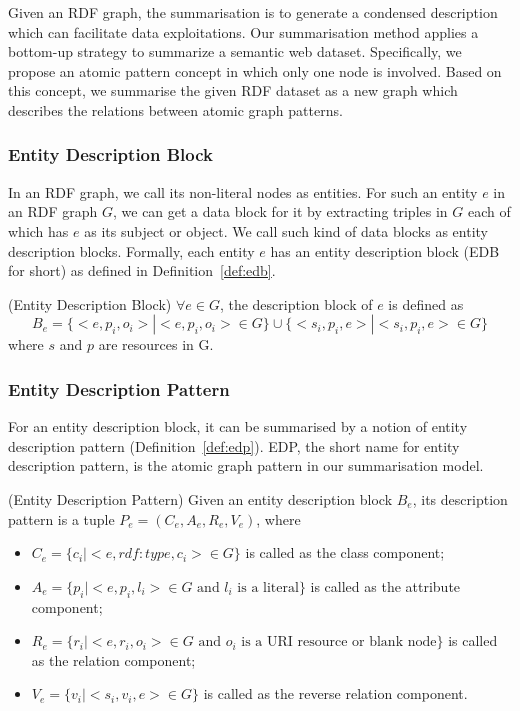 \vspace{-2mm}
Given an RDF graph, the summarisation is to generate a condensed description which can facilitate data exploitations. Our summarisation method applies a bottom-up strategy to summarize a semantic web dataset. Specifically, we propose an atomic pattern concept in which only one node is involved. Based on this concept, we summarise the given RDF dataset as a new graph which describes the relations between atomic graph patterns.

\vspace{-4ex}
\subsubsection{Entity Description Block}
In an RDF graph, we call its non-literal nodes as entities. For such an entity $e$ in an RDF graph $G$, we can get a data block for it by extracting triples in $G$ each of which has $e$ as its subject or object. We call such kind of data blocks as entity description blocks. Formally, each entity $e$ has an entity description block (EDB for short) as defined in Definition~\ref{def:edb}.
\vspace{-1ex}
\begin{definition}
\label{def:edb}
 (Entity Description Block)
$\forall e \in G$, the description block of $e$ is defined as 
\begin{equation}
B_e= \{<e,p_i,o_i>|<e,p_i,o_i> \in G\} \cup \{<s_i,p_i,e>|<s_i,p_i,e> \in G\}
\end{equation}
where $s$ and $p$ are resources in G.
\end{definition}

\vspace{-5ex}
\subsubsection{Entity Description Pattern}
For an entity description block, it can be summarised by a notion of entity description pattern (Definition~\ref{def:edp}). EDP, the short name for entity description pattern, is the atomic graph pattern in our summarisation model. 
\vspace{-1ex}
\begin{definition}
\label{def:edp} 
(Entity Description Pattern) Given an entity description block $B_e$, its description pattern is a tuple $P_e=(C_e,A_e,R_e,V_e)$, where
\begin{itemize}
\item $C_e=\{c_i |<e,rdf:type,c_i> \in G\}$   is called as the class component; 
\item $A_e=\{p_i |<e,p_i,l_i> \in G \text{ and $l_i$  is a literal}\}$  is called as the attribute component;
\item $R_e=\{r_i |<e,r_i,o_i> \in G \text{ and $o_i$  is a URI resource or blank node}\}$  is called as the relation component;
\item $V_e=\{v_i |<s_i,v_i,e> \in G\}$ is called as the reverse relation component.
\end{itemize}
\end{definition}

